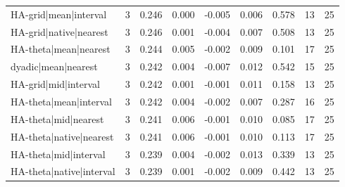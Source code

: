 \begin{tabular}{lrrrrrrrr}
HA-grid|mean|interval & 3 & 0.246 & 0.000 & -0.005 & 0.006 & 0.578 & 13 & 25 \\
HA-grid|native|nearest & 3 & 0.246 & 0.001 & -0.004 & 0.007 & 0.508 & 13 & 25 \\
HA-theta|mean|nearest & 3 & 0.244 & 0.005 & -0.002 & 0.009 & 0.101 & 17 & 25 \\
dyadic|mean|nearest & 3 & 0.242 & 0.004 & -0.007 & 0.012 & 0.542 & 15 & 25 \\
HA-grid|mid|interval & 3 & 0.242 & 0.001 & -0.001 & 0.011 & 0.158 & 13 & 25 \\
HA-theta|mean|interval & 3 & 0.242 & 0.004 & -0.002 & 0.007 & 0.287 & 16 & 25 \\
HA-theta|mid|nearest & 3 & 0.241 & 0.006 & -0.001 & 0.010 & 0.085 & 17 & 25 \\
HA-theta|native|nearest & 3 & 0.241 & 0.006 & -0.001 & 0.010 & 0.113 & 17 & 25 \\
HA-theta|mid|interval & 3 & 0.239 & 0.004 & -0.002 & 0.013 & 0.339 & 13 & 25 \\
HA-theta|native|interval & 3 & 0.239 & 0.001 & -0.002 & 0.009 & 0.442 & 13 & 25 \\
\bottomrule
\end{tabular}
